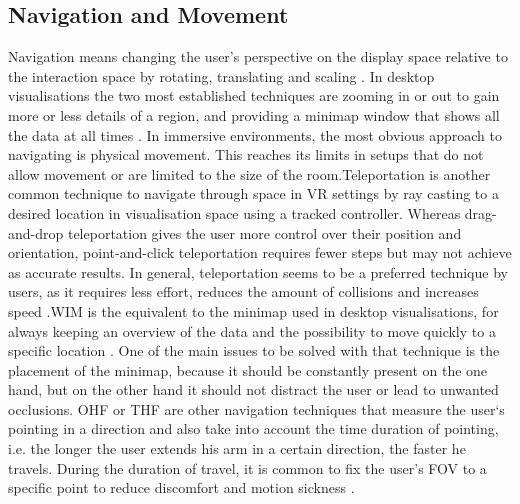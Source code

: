 \subsection{Navigation and Movement}
\label{subsection:Navigation}
Navigation means changing the user's perspective on the display space relative to the interaction space by rotating, translating and scaling \autocite[48]{Cordeil2017}. In desktop visualisations the two most established techniques are zooming in or out to gain more or less details of a region, and providing a minimap window that shows all the data at all times \autocite[1214]{Yang2021}. In immersive environments, the most obvious approach to navigating is physical movement. This reaches its limits in setups that do not allow movement or are limited to the size of the room.\newline Teleportation is another common technique to navigate through space in \ac{VR} settings by ray casting to a desired location in visualisation space using a tracked controller. Whereas drag-and-drop teleportation gives the user more control over their position and orientation, point-and-click teleportation requires fewer steps but may not achieve as accurate results. In general, teleportation seems to be a preferred technique by users, as it requires less effort, reduces the amount of collisions and increases speed \autocite[2]{Drogemuller2020}.\newline\ac{WIM} is the equivalent to the minimap used in desktop visualisations, for always keeping an overview of the data and the possibility to move quickly to a specific location \autocite[1214]{Yang2021}. One of the main issues to be solved with that technique is the placement of the minimap, because it should be constantly present on the one hand, but on the other hand it should not distract the user or lead to unwanted occlusions. \newline
\ac{OHF} or \ac{THF} are other navigation techniques that measure the user`s pointing in a direction and also take into account the time duration of pointing, i.e. the longer the user extends his arm in a certain direction, the faster he travels. During the duration of travel, it is common to fix the user's \ac{FOV} to a specific point to reduce discomfort and motion sickness \autocite[2]{Drogemuller2020}.

